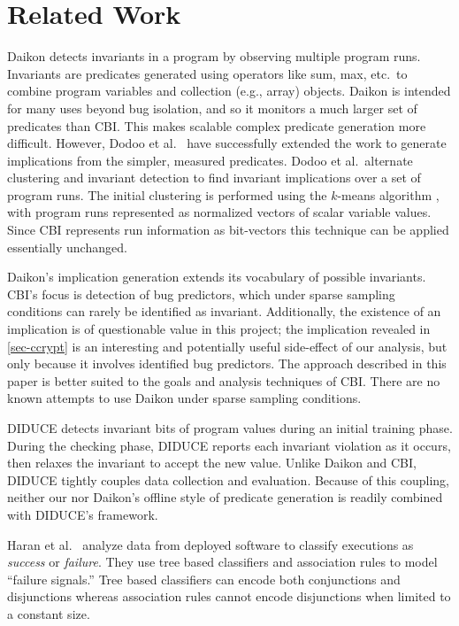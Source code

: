 
\section{Related Work}
\label{sec-related-work}
Daikon \cite{ErnstCGN2001:TSE} detects invariants in a program by observing multiple program runs.  Invariants are predicates generated using operators like sum, max, etc.\ to combine program variables and collection (e.g., array) objects.  Daikon is intended for many uses beyond bug isolation, and so it monitors a much larger set of predicates than CBI.  This makes scalable complex predicate generation more difficult.  However, Dodoo et al.\ \cite{ErnstDRAFT} have successfully extended the work to generate implications from the simpler, measured predicates.  Dodoo et al.\ alternate clustering and invariant detection to find invariant implications over a set of program runs.  The initial clustering is performed using the $k$-means algorithm \cite{jain99data}, with program runs represented as normalized vectors of scalar variable values.  Since CBI represents run information as bit-vectors this technique can be applied essentially unchanged.

Daikon's implication generation extends its vocabulary of possible invariants.  CBI's focus is detection of bug predictors, which under sparse sampling conditions can rarely be identified as invariant.  Additionally, the existence of an implication is of questionable value in this project; the implication revealed in \autoref{sec-ccrypt} is an interesting and potentially useful side-effect of our analysis, but only because it involves identified bug predictors.  The approach described in this paper is better suited to the goals and analysis techniques of CBI\@.  There are no known attempts to use Daikon under sparse sampling conditions.

DIDUCE \cite{581377} detects invariant bits of program values during an initial training phase.  During the checking phase, DIDUCE reports each invariant violation as it occurs, then relaxes the invariant to accept the new value.  Unlike Daikon and CBI, DIDUCE tightly couples data collection and evaluation.  Because of this coupling, neither our nor Daikon's offline style of predicate generation is readily combined with DIDUCE's framework.

Haran et al.\ \cite{haran05TCEDS} analyze data from deployed software to classify executions as \emph{success} or \emph{failure}.  They use tree based classifiers and association rules to model ``failure signals.''  Tree based classifiers can encode both conjunctions and disjunctions whereas association rules cannot encode disjunctions when limited to a constant size.

